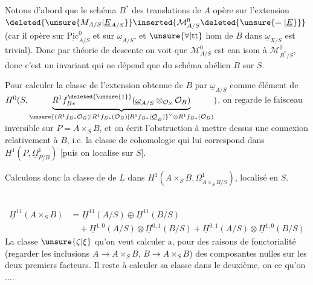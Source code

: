 Notons d'abord que le schéma $B^{*}$ des translations de $A$ opère  sur l'extension $\deleted{\unsure{M_{A/S}|\underline E_{A/S}}}\inserted{\mathcal M_{A/S}^{0}\deleted{\unsure{=|\underline E}}}$ (car il opère  sur $\underline{\mathrm{Pic}}^{0}_{A/S}$ et sur $\underline{\omega}_{A/S}$\deleted{)}, et $\unsure{\forall|\mathrm{tt}}$ hom de $B$ dans $\underline{\omega}_{X/S}$ est trivial). Donc par théorie de descente on voit que $\mathcal M^{0}_{A/S}$ est can isom à $\mathcal M^{0}_{B^{*}/S}$, donc c'est un invariant qui ne dépend que du  schéma abélien $B$ sur $S$.

Pour calculer la classe de l'extension obtenue de $B$ par $\underline{\omega}_{A/S}$ comme élément de $H^{0}(S,\underbrace{R^{1}f_{B*}^{\deleted{\unsure{1}}}(\underline{\omega}_{A/S}\otimes_{\mathcal O_S}\mathcal O_B)}_{\unsure{(R^{1}f_{B*}\mathcal O_{B})|R^{1}f_{B*}(\mathcal O_{B})|R^{1}f_{B*}(\underline{\mathcal O}_{B})}^{\vee}\otimes R^{1}f_{B*}(\mathcal O_{B})})$, on regarde  le faisceau inversible  sur $P=A\times_{S}B$, et on écrit
l'obstruction à mettre dessus une connexion relativement à $B$, i.e. la classe de cohomologie qui lui correspond dans $H^{1}(P,\underline{\Omega}^{1}_{P/B})$ [puis on localise sur $S$].

Calculons donc la classe de  de $\underline L$ dans $H^{1}(A\times_{S}B,\underline{\Omega}^{1}_{A\times_{S}B/S})$, localisé en $S$.


\\


\[
\begin{aligned}
\underline{H}^{11}(A\times_{S}B)&=\underline{H}^{11}(A/S)\oplus\underline{H}^{11}(B/S)\\
&\quad+\underline{H}^{1,0}(A/S)\otimes\underline{H}^{0,1}(B/S)+\underline{H}^{0,1}(A/S)\otimes\underline{H}^{1,0}(B/S)
\end{aligned}
\]
La classe $\unsure{\zeta|\xi}$ qu'on veut calculer a, pour des raisons de fonctorialité (regarder les inclusions $A\longrightarrow A\times_{S}B$, $B\longrightarrow A\times_{S}B$) des composantes nulles sur les deux premiers facteurs. Il reste à calculer sa classe dans le deuxième, on  ce qu'on ....

